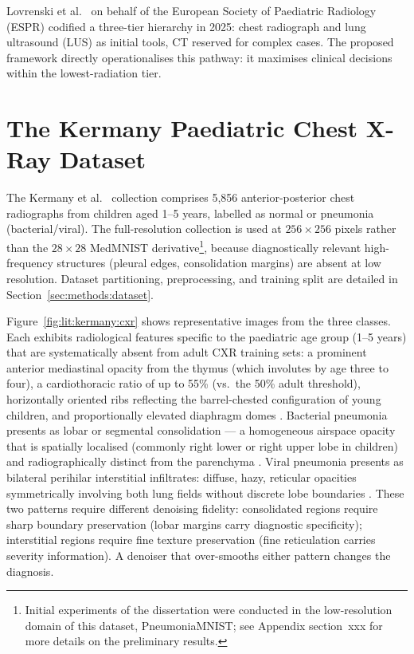 \documentclass[12pt, a4paper, twoside, openright]{book}
\begin{document}
Lovrenski et al.\ \cite{lovrenski_esr_2025} on behalf of the European Society of Paediatric Radiology (ESPR) codified a three-tier hierarchy in 2025: chest radiograph and lung ultrasound (LUS) as initial tools, CT reserved for complex cases. The proposed framework directly operationalises this pathway: it maximises clinical decisions within the lowest-radiation tier.

\section{The Kermany Paediatric Chest X-Ray Dataset}
\label{sec:lit:kermany}

The Kermany et al.\ \cite{kermany_identifying_2018} collection comprises 5,856 anterior-posterior chest radiographs from children aged 1--5 years, labelled as normal or pneumonia (bacterial/viral). The full-resolution collection is used at $256\times256$ pixels rather than the $28\times28$ MedMNIST \cite{yang_medmnist_2023} derivative\footnote{Initial experiments of the dissertation were conducted in the low-resolution domain of this dataset, PneumoniaMNIST; see Appendix section~xxx for more details on the preliminary results.}, because diagnostically relevant high-frequency structures (pleural edges, consolidation margins) are absent at low resolution. Dataset partitioning, preprocessing, and training split are detailed in Section~\ref{sec:methods:dataset}.

Figure~\ref{fig:lit:kermany:cxr} shows representative images from the three classes. Each exhibits radiological features specific to the paediatric age group (1--5 years) that are systematically absent from adult CXR training sets: a prominent anterior mediastinal opacity from the thymus (which involutes by age three to four), a cardiothoracic ratio of up to 55\% (vs.\ the 50\% adult threshold), horizontally oriented ribs reflecting the barrel-chested configuration of young children, and proportionally elevated diaphragm domes \cite{laborie_scoping_2026}. Bacterial pneumonia presents as lobar or segmental consolidation --- a homogeneous airspace opacity that is spatially localised (commonly right lower or right upper lobe in children) and radiographically distinct from the parenchyma \cite{world_health_organisation_classification_2020}. Viral pneumonia presents as bilateral perihilar interstitial infiltrates: diffuse, hazy, reticular opacities symmetrically involving both lung fields without discrete lobe boundaries \cite{kermany_identifying_2018}. These two patterns require different denoising fidelity: consolidated regions require sharp boundary preservation (lobar margins carry diagnostic specificity); interstitial regions require fine texture preservation (fine reticulation carries severity information). A denoiser that over-smooths either pattern changes the diagnosis.
\end{document}
